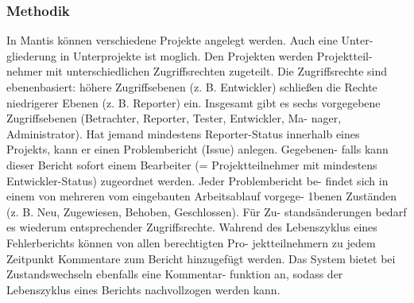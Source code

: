 \subsubsection{Methodik}
In Mantis können verschiedene Projekte angelegt werden. Auch eine Unter-
gliederung in Unterprojekte ist moglich. Den Projekten werden Projektteil-
nehmer mit unterschiedlichen Zugriffsrechten zugeteilt. Die Zugriffsrechte
sind ebenenbasiert: höhere Zugriffsebenen (z. B. Entwickler) schließen die
Rechte niedrigerer Ebenen (z. B. Reporter) ein. Insgesamt gibt es sechs
vorgegebene Zugriffsebenen (Betrachter, Reporter, Tester, Entwickler, Ma-
nager, Administrator). Hat jemand mindestens Reporter-Status innerhalb
eines Projekts, kann er einen Problembericht (Issue) anlegen. Gegebenen-
falls kann dieser Bericht sofort einem Bearbeiter (= Projektteilnehmer mit
mindestens Entwickler-Status) zugeordnet werden. Jeder Problembericht be-
findet sich in einem von mehreren vom eingebauten Arbeitsablauf vorgege-
1benen Zuständen (z. B. Neu, Zugewiesen, Behoben, Geschlossen). Für Zu-
standsänderungen bedarf es wiederum entsprechender Zugriffsrechte. Wahrend
des Lebenszyklus eines Fehlerberichts können von allen berechtigten Pro-
jektteilnehmern zu jedem Zeitpunkt Kommentare zum Bericht hinzugefügt
werden. Das System bietet bei Zustandswechseln ebenfalls eine Kommentar-
funktion an, sodass der Lebenszyklus eines Berichts nachvollzogen werden
kann.



